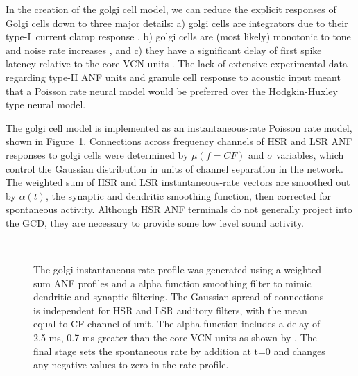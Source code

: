 In the creation of the golgi cell model, we can reduce the explicit responses of
Golgi cells down to three major details: a) golgi cells are integrators due to
their type-I~current clamp response \citep{FerragamoGoldingEtAl:1998}, b) golgi
cells are (most likely) monotonic to tone and noise rate increases
\citep{GhoshalKim:1997}, and c) they have a significant delay of first spike
latency relative to the core VCN units \citep{GhoshalKim:1997}. The lack of
extensive experimental data regarding type-II ANF units and granule cell
response to acoustic input meant that a Poisson rate neural model would be
preferred over the Hodgkin-Huxley type neural model.
\medskip{}

The golgi cell model is implemented as an instantaneous-rate Poisson rate model,
shown in Figure~\ref{fig:GolgiDiagram}. Connections across frequency channels of
HSR and LSR ANF responses to golgi cells were determined by $\mu(f=CF)$ and
$\sigma$ variables, which control the Gaussian distribution in units of channel
separation in the network. The weighted sum of HSR and LSR instantaneous-rate
vectors are smoothed out by $\alpha(t)$, the synaptic and dendritic smoothing
function, then corrected for spontaneous activity.  Although HSR ANF terminals
do not generally project into the GCD, they are necessary to provide some low
level sound activity.  \medskip{}

 \begin{figure}[h!]
   \centering
   \\
  \caption{The golgi instantaneous-rate profile was generated using a weighted sum ANF profiles and a alpha function smoothing filter to mimic dendritic and synaptic filtering. The Gaussian spread of connections is independent for HSR and LSR auditory filters, with the mean equal to CF channel of unit. The alpha function includes a delay of 2.5 ms, 0.7 ms greater than the core VCN units as shown by \citet{GhoshalKim:1997}. The final stage sets the spontaneous rate by addition at t=0 and changes any negative values to zero in the rate profile.  
  }\label{fig:GolgiDiagram}
 \end{figure}

 \medskip{}

